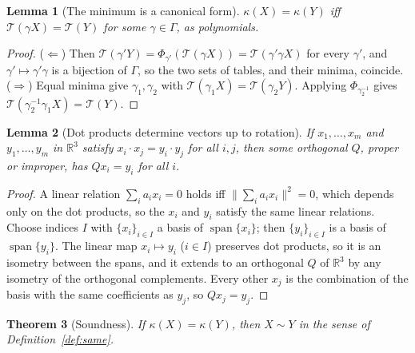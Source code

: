 \documentclass[11pt]{article}
\newtheorem{theorem}{Theorem}
\newtheorem{lemma}[theorem]{Lemma}
\theoremstyle{definition}
\begin{document}
\begin{lemma}[The minimum is a canonical form]\label{lem:orbitmin}
$\kappa(X)=\kappa(Y)$ iff $\mathcal T(\gamma X)=\mathcal T(Y)$ for some
$\gamma\in\Gamma$, as polynomials.
\end{lemma}

\begin{proof}
($\Leftarrow$) Then $\mathcal T(\gamma'Y)=\Phi_{\gamma'}(\mathcal T(\gamma X))
=\mathcal T(\gamma'\gamma X)$ for every $\gamma'$, and $\gamma'\mapsto\gamma'\gamma$
is a bijection of $\Gamma$, so the two sets of tables, and their minima,
coincide. ($\Rightarrow$) Equal minima give $\gamma_1,\gamma_2$ with
$\mathcal T(\gamma_1X)=\mathcal T(\gamma_2Y)$. Applying $\Phi_{\gamma_2^{-1}}$
gives $\mathcal T(\gamma_2^{-1}\gamma_1X)=\mathcal T(Y)$.
\end{proof}

\begin{lemma}[Dot products determine vectors up to rotation]\label{lem:gram}
If $x_1,\dots,x_m$ and $y_1,\dots,y_m$ in $\mathbb R^3$ satisfy
$x_i\cdot x_j=y_i\cdot y_j$ for all $i,j$, then some orthogonal $Q$, proper or
improper, has $Qx_i=y_i$ for all $i$.
\end{lemma}

\begin{proof}
A linear relation $\sum_ia_ix_i=0$ holds iff $\lVert\sum_ia_ix_i\rVert^2=0$,
which depends only on the dot products, so the $x_i$ and $y_i$ satisfy the
same linear relations. Choose indices $I$ with $\{x_i\}_{i\in I}$ a basis of
$\operatorname{span}\{x_i\}$; then $\{y_i\}_{i\in I}$ is a basis of
$\operatorname{span}\{y_i\}$. The linear map $x_i\mapsto y_i$ ($i\in I$)
preserves dot products, so it is an isometry between the spans, and it
extends to an orthogonal $Q$ of $\mathbb R^3$ by any isometry of the
orthogonal complements. Every other $x_j$ is the combination of the basis with
the same coefficients as $y_j$, so $Qx_j=y_j$.
\end{proof}

\begin{theorem}[Soundness]\label{thm:dotsound}
If $\kappa(X)=\kappa(Y)$, then $X\sim Y$ in the sense of
Definition~\ref{def:same}.
\end{theorem}
\end{document}
